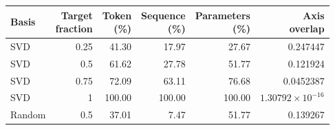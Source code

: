 \begin{center}\small
\begin{tabular}{@{}lrrrrr@{}}
\toprule
Basis & \shortstack{Target\\fraction} & \shortstack{Token\\(\%)} & \shortstack{Sequence\\(\%)} & \shortstack{Parameters\\(\%)} & \shortstack{Axis\\overlap} \\
\midrule
SVD & 0.25 & 41.30 & 17.97 & 27.67 & 0.247447 \\
SVD & 0.5 & 61.62 & 27.78 & 51.77 & 0.121924 \\
SVD & 0.75 & 72.09 & 63.11 & 76.68 & 0.0452387 \\
SVD & 1 & 100.00 & 100.00 & 100.00 & $1.30792\times 10^{-16}$ \\
Random & 0.5 & 37.01 & 7.47 & 51.77 & 0.139267 \\
\bottomrule
\end{tabular}
\end{center}
